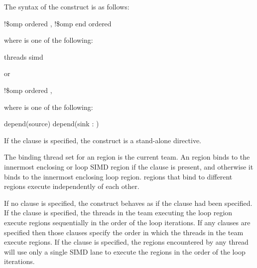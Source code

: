 {{{{\begin{samepage}
\ccppspecificend
\end{samepage}

\fortranspecificstart
The syntax of the  construct is as follows:

\begin{boxedcode}
!\$omp ordered \plc{[clause[ [},\plc{] clause] ]}
!\$omp end ordered
\end{boxedcode}

where  is one of the following:
\begin{indentedcodelist}
threads
simd
\end{indentedcodelist}

or

\begin{boxedcode}
!\$omp ordered \plc{clause [[[},\plc{] clause] ... ]}
\end{boxedcode}

where  is one of the following:
\begin{indentedcodelist}
depend(source)
depend(sink : )
\end{indentedcodelist}
\fortranspecificend

If the  clause is specified, the  construct is a stand-alone directive.
 
\binding
The binding thread set for an  region is the current team. An  region 
binds to the innermost enclosing  or loop SIMD region if the
 clause is present, and otherwise it binds to the innermost
enclosing loop region.  regions that bind to different regions
execute independently of each other.

\descr
If no clause is specified, the  construct behaves as if the
 clause had been specified. If the  clause is
specified, the threads in the team executing the loop region execute
 regions sequentially in the order of the loop iterations.
If any  clauses are specified then those clauses specify the 
order in which the threads in the team execute  regions. If
the  clause is specified, the  regions encountered by
any thread will use only a single SIMD lane to execute the 
regions in the order of the loop iterations.

}}}}
